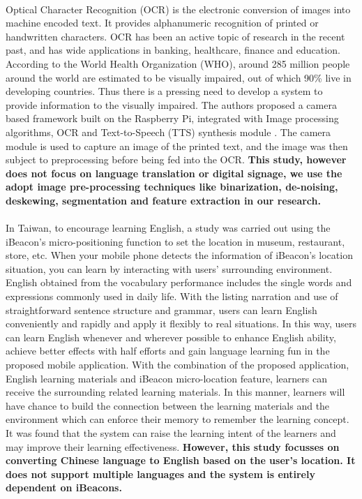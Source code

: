 \documentclass[12pt]{article}
\begin{document}
\paragraph{}Optical Character Recognition (OCR) is the electronic conversion of images into machine encoded text. It provides alphanumeric recognition of printed or handwritten characters. OCR has been an active topic of research in the recent past, and has wide applications in banking, healthcare, finance and education. According to the World Health Organization (WHO), around 285 million people around the world are estimated to be visually impaired, out of which 90\% live in developing countries. Thus there is a pressing need to develop a system to provide information to the visually impaired. The authors  proposed a camera based framework built on the Raspberry Pi, integrated with Image processing algorithms, OCR and Text-to-Speech (TTS) synthesis module \cite{ocr}. The camera module is used to capture an image of the printed text, and the image was then subject to preprocessing before being fed into the OCR.\cite{ocr} \textbf{This study, however does not focus on language translation or digital signage, we use the adopt image pre-processing techniques like binarization, de-noising, deskewing, segmentation and feature extraction in our research.}

\paragraph{}In Taiwan, to encourage learning English, a study was carried out using the iBeacon's micro-positioning function to set the location in museum, restaurant, store, etc. When your mobile phone detects the information of iBeacon's location situation, you can learn by interacting with users' surrounding environment. \cite{taiwan} English obtained from the vocabulary performance includes the single words and expressions commonly used in daily life. With the listing narration and use of straightforward sentence structure and grammar, users can learn English conveniently and rapidly and apply it flexibly to real situations. In this way, users can learn English whenever and wherever possible to enhance English ability, achieve better effects with half efforts and gain language learning fun in the proposed mobile application. With the combination of the proposed application, English learning materials and iBeacon micro-location feature, learners can receive the surrounding related learning materials. In this manner, learners will have chance to build the connection between the learning materials and the environment which can enforce their memory to remember the learning concept.  \cite{taiwan} It was found that the system can raise the learning intent of the learners and may improve their learning effectiveness. \textbf{However, this study focusses on converting Chinese language to English based on the user's location. It does not support multiple languages and the system is entirely dependent on iBeacons.}
\end{document}

